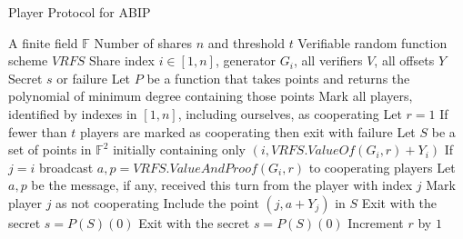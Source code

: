 \documentclass[12pt]{dalcsthesis}
\begin{document}
\begin{algorithm}
  \caption{Player Protocol for ABIP}
  \label{alg:ABIP:Player}
  \begin{algorithmic}
    \INPUT A finite field $\mathbb{F}$
    \INPUT Number of shares $n$ and threshold $t$
    \INPUT Verifiable random function scheme $VRFS$
    \INPUT Share index $i \in [1, n]$, generator $G_i$, all verifiers $V$, all offsets $Y$
    \OUTPUT Secret $s$ or failure
    \STATE Let $P$ be a function that takes points and returns the polynomial of minimum degree containing those points 
    \STATE Mark all players, identified by indexes in $[1, n]$, including ourselves, as cooperating
    \STATE Let $r = 1$
      \STATE If fewer than $t$ players are marked as cooperating then exit with failure
      \STATE Let $S$ be a set of points in $\mathbb{F}^2$ initially containing only $(i, VRFS.ValueOf(G_i, r) + Y_i)$
        \STATE If $j = i$ broadcast $a,p = VRFS.ValueAndProof(G_i, r)$ to cooperating players
        \STATE Let $a, p$ be the message, if any, received this turn from the player with index $j$
          \STATE Mark player $j$ as not cooperating
        \ELSE
          \STATE Include the point $(j, a + Y_j)$ in $S$
            \STATE Exit with the secret $s = P(S)(0)$
          \ENDIF
        \ENDIF
      \ENDFOR
        \STATE Exit with the secret $s = P(S)(0)$
      \ENDIF
      \STATE Increment $r$ by $1$
    \ENDWHILE
  \end{algorithmic}
\end{algorithm}
\end{document}
